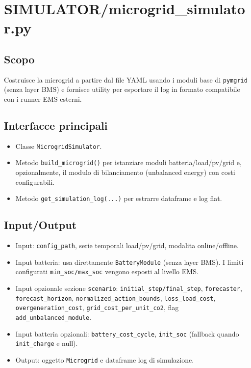 \section{SIMULATOR/microgrid\_simulator.py}

\subsection*{Scopo}
Costruisce la microgrid a partire dal file YAML usando i moduli base di \texttt{pymgrid} (senza layer BMS) e fornisce utility per esportare il log in formato compatibile con i runner EMS esterni.

\subsection*{Interfacce principali}
\begin{itemize}[leftmargin=1.2cm]
\item Classe \texttt{MicrogridSimulator}.
\item Metodo \texttt{build\_microgrid()} per istanziare moduli batteria/load/pv/grid e, opzionalmente, il modulo di bilanciamento (unbalanced energy) con costi configurabili.
\item Metodo \texttt{get\_simulation\_log(...)} per estrarre dataframe e log flat.
\end{itemize}

\subsection*{Input/Output}
\begin{itemize}[leftmargin=1.2cm]
\item Input: \texttt{config\_path}, serie temporali load/pv/grid, modalita online/offline.
\item Input batteria: usa direttamente \texttt{BatteryModule} (senza layer BMS). I limiti configurati \texttt{min\_soc/max\_soc} vengono esposti al livello EMS.
\item Input opzionale sezione \texttt{scenario}: \texttt{initial\_step/final\_step}, \texttt{forecaster}, \texttt{forecast\_horizon}, \texttt{normalized\_action\_bounds}, \texttt{loss\_load\_cost}, \texttt{overgeneration\_cost}, \texttt{grid\_cost\_per\_unit\_co2}, flag \texttt{add\_unbalanced\_module}.
\item Input batteria opzionali: \texttt{battery\_cost\_cycle}, \texttt{init\_soc} (fallback quando \texttt{init\_charge} e null).
\item Output: oggetto \texttt{Microgrid} e dataframe log di simulazione.
\end{itemize}

